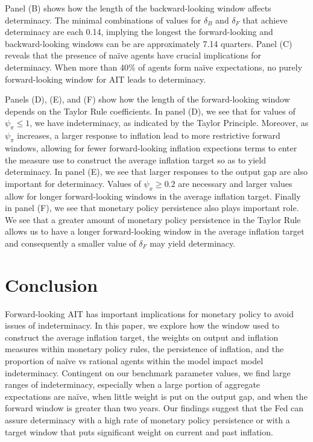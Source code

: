 \documentclass[english,authoryear,12pt]{elsarticle}
\begin{document}
Panel (B) shows how the length of the backward-looking window affects determinacy. The minimal combinations of values for $\delta_B$ and $\delta_F$ that achieve determinacy are each 0.14, implying the longest the forward-looking and backward-looking windows can be are approximately 7.14 quarters. Panel (C) reveals that the presence of na\"ive agents have crucial implications for determinacy. When more than 40\% of agents form na\"ive expectations, no purely forward-looking window for AIT leads to determinacy.

Panels (D), (E), and (F) show how the length of the forward-looking window depends on the Taylor Rule coefficients. In panel (D), we see that for values of $\psi_\pi \leq 1$, we have indeterminacy, as indicated by the Taylor Principle. Moreover, as $\psi_\pi$ increases, a larger response to inflation lead to more restrictive forward windows, allowing for fewer forward-looking inflation expections terms to enter the measure use to construct the average inflation target so as to yield determinacy. In panel (E), we see that larger responses to the output gap are also important for determinacy. Values of $\psi_x \geq 0.2$ are necessary and larger values allow for longer forward-looking windows in the average inflation target.  Finally in panel (F), we see that monetary policy persistence also plays important role. We see that a greater amount of monetary policy persistence in the Taylor Rule allows us to have a longer forward-looking window in the average inflation target and consequently a smaller value of $\delta_F$ may yield determinacy.

\section{\label{Conc}Conclusion}

Forward-looking AIT has important implications for monetary policy to avoid issues of indeterminacy. In this paper, we explore how the window used to construct the average inflation target, the weights on output and inflation measures within monetary policy rules, the persistence of inflation, and the proportion of na\"ive vs rational agents within the model impact model indeterminacy. Contingent on our benchmark parameter values, we find large ranges of indeterminacy, especially when a large portion of aggregate expectations are na\"ive, when little weight is put on the output gap, and when the forward window is greater than two years. Our findings suggest that the Fed can assure determinacy with a high rate of monetary policy persistence or with a target window that puts significant weight on current and past inflation.



\end{document}
